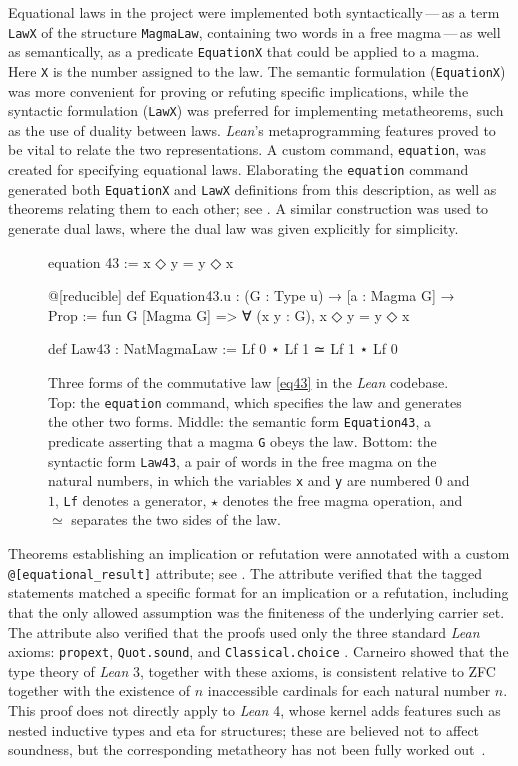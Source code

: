 Equational laws in the project were implemented both syntactically\,---\,as a term \texttt{LawX} of the structure \texttt{MagmaLaw}, containing two words in a free magma\,---\,as well as semantically, as a predicate \texttt{EquationX} that could be applied to a magma. Here \texttt{X} is the number assigned to the law. The semantic formulation (\texttt{EquationX}) was more convenient for proving or refuting specific implications, while the syntactic formulation (\texttt{LawX}) was preferred for implementing metatheorems, such as the use of duality between laws. \emph{Lean}'s metaprogramming features proved to be vital to relate the two representations. A custom command, \texttt{equation}, was created for specifying equational laws. Elaborating the \texttt{equation} command generated both \texttt{EquationX} and \texttt{LawX} definitions from this description, as well as theorems relating them to each other; see . A similar construction was used to generate dual laws, where the dual law was given explicitly for simplicity.

\begin{figure}
\centering
\begin{lean}
equation 43 := x ◇ y = y ◇ x

@[reducible] def Equation43.{u} : (G : Type u) → [a : Magma G] → Prop :=
fun G [Magma G] => ∀ (x y : G), x ◇ y = y ◇ x

def Law43 : NatMagmaLaw :=
Lf 0 ⋆ Lf 1 ≃ Lf 1 ⋆ Lf 0
\end{lean}
\caption{Three forms of the commutative law \eqref{eq43} in the \emph{Lean} codebase.  Top: the \texttt{equation} command, which specifies the law and generates the other two forms.  Middle: the semantic form \texttt{Equation43}, a predicate asserting that a magma \texttt{G} obeys the law.  Bottom: the syntactic form \texttt{Law43}, a pair of words in the free magma on the natural numbers, in which the variables \texttt{x} and \texttt{y} are numbered $0$ and $1$, \texttt{Lf} denotes a generator, $\star$ denotes the free magma operation, and $\simeq$ separates the two sides of the law.}
\label{fig:eq43}
\end{figure}

Theorems establishing an implication or refutation were annotated with a custom \texttt{@{[}equational\_result{]}} attribute; see .  The attribute verified that the tagged statements matched a specific format for an implication or a refutation, including that the only allowed assumption was the finiteness of the underlying carrier set.  The attribute also verified that the proofs used only the three standard \emph{Lean} axioms: \texttt{propext}, \texttt{Quot.sound}, and \texttt{Classical.choice} \cite{leanLangRefAxioms}.  Carneiro \cite[Corollary~6.8]{carneiroThesis} showed that the type theory of \emph{Lean} 3, together with these axioms, is consistent relative to ZFC together with the existence of $n$ inaccessible cardinals for each natural number $n$.  This proof does not directly apply to \emph{Lean} 4, whose kernel adds features such as nested inductive types and eta for structures; these are believed not to affect soundness, but the corresponding metatheory has not been fully worked out~\cite{lean4lean}.

